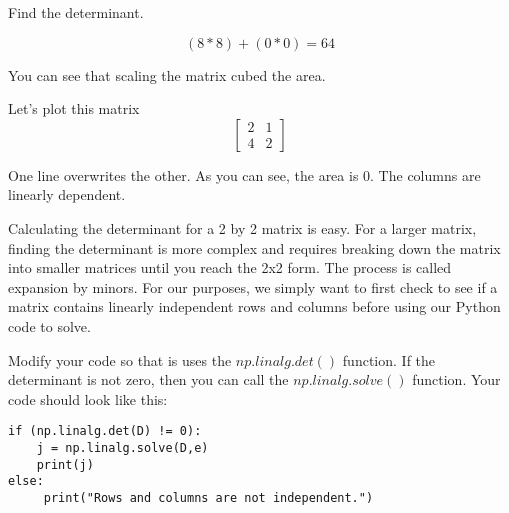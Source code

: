 Find the determinant. 

$$(8*8)+(0*0) = 64$$

You can see that scaling the matrix cubed the area.

 
Let's plot this matrix
$$
\begin{bmatrix}
2 & 1  \\
4 & 2 
\end{bmatrix}
$$


One line overwrites the other. As you can see, the area is 0. The columns are 
linearly dependent.

Calculating the determinant for a 2 by 2 matrix is easy. For a larger matrix, 
finding the determinant is more complex and requires breaking down the matrix 
into smaller matrices until you reach the 2x2 form. The process is called 
expansion by minors. For our purposes, we simply want to first check to see if 
a matrix contains linearly independent rows and columns before using our 
Python code to solve. 

Modify your code so that is uses the $np.linalg.det()$ function. If the 
determinant is not zero, then you can call the $np.linalg.solve()$ function. 
Your code should look like this:
\begin{Verbatim}
if (np.linalg.det(D) != 0):
    j = np.linalg.solve(D,e)
    print(j)
else:
     print("Rows and columns are not independent.")
\end{Verbatim}

